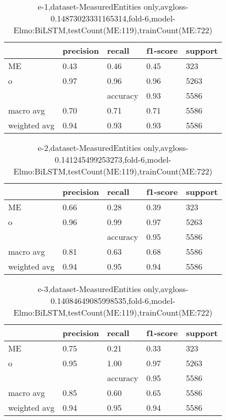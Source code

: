 \begin{table}[!ht] 
\centering
\caption{e-1,dataset-MeasuredEntities only,avgloss-0.14873023331165314,fold-6,model-Elmo:BiLSTM,testCount(ME:119),trainCount(ME:722)}\label{e-1data-meS.tsv}
\begin{tabularx}{300pt}{|X|X|X|X|X|}
\hline
&precision&recall&f1-score&support\\
\hline
ME&0.43&0.46&0.45&323\\
\hline
o&0.97&0.96&0.96&5263\\
\hline
&&accuracy&0.93&5586\\
\hline
macro avg&0.70&0.71&0.71&5586\\
\hline
weighted avg&0.94&0.93&0.93&5586\\
\hline
\end{tabularx}
\end{table}
\begin{table}[!ht] 
\centering
\caption{e-2,dataset-MeasuredEntities only,avgloss-0.141245499253273,fold-6,model-Elmo:BiLSTM,testCount(ME:119),trainCount(ME:722)}\label{e-2data-meS.tsv}
\begin{tabularx}{300pt}{|X|X|X|X|X|}
\hline
&precision&recall&f1-score&support\\
\hline
ME&0.66&0.28&0.39&323\\
\hline
o&0.96&0.99&0.97&5263\\
\hline
&&accuracy&0.95&5586\\
\hline
macro avg&0.81&0.63&0.68&5586\\
\hline
weighted avg&0.94&0.95&0.94&5586\\
\hline
\end{tabularx}
\end{table}
\begin{table}[!ht] 
\centering
\caption{e-3,dataset-MeasuredEntities only,avgloss-0.14084649085998535,fold-6,model-Elmo:BiLSTM,testCount(ME:119),trainCount(ME:722)}\label{e-3data-meS.tsv}
\begin{tabularx}{300pt}{|X|X|X|X|X|}
\hline
&precision&recall&f1-score&support\\
\hline
ME&0.75&0.21&0.33&323\\
\hline
o&0.95&1.00&0.97&5263\\
\hline
&&accuracy&0.95&5586\\
\hline
macro avg&0.85&0.60&0.65&5586\\
\hline
weighted avg&0.94&0.95&0.94&5586\\
\hline
\end{tabularx}
\end{table}
